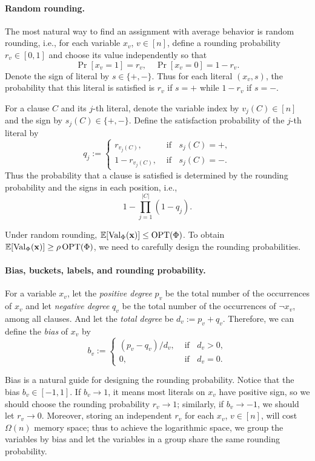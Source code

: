 \paragraph{Random rounding.} The most natural way to find an assignment with average behavior is random rounding, i.e., for each variable $x_v$, $v\in [n]$, define a rounding probability $r_v\in [0,1]$ and choose its value independently so that 
\[
\Pr[x_v=1] = r_v,\quad \Pr[x_v=0] = 1-  r_v.
\]
Denote the sign of  literal by $s\in \{+,-\}$. Thus for each literal $(x_v,s)$, the probability that this literal is satisfied is
$r_v$ if $s= +$ while $1-r_v$ if $s= -$.



For a clause $C$ and its $j$-th literal, denote the variable index by $v_{j}(C)\in [n]$ and the sign by $s_{j}(C)\in \{+,-\}$.
Define the satisfaction probability of the $j$-th literal by \[
q_{j} := \begin{cases}
    r_{v_{j}(C)},& \text{ if }\;\; s_{j}(C)=+,\\
    1-r_{v_{j}(C)},& \text{ if }\;\; s_{j}(C)=-.
\end{cases}
\]
Thus the probability that a clause is satisfied is determined by the rounding probability and the signs in each position, i.e., 
\begin{equation}
\label{eq:satisfied_probability}
    1-\prod_{j=1}^{|C|}(1-q_{j}).
\end{equation} 

Under random rounding, $\mathbb E[\operatorname{Val}_\Phi(\mathbf{x})]\le\operatorname{OPT}(\Phi)$. To obtain $\mathbb E[\operatorname{Val}_\Phi(\mathbf{x})]\ge\rho\operatorname{OPT}(\Phi)$, we need to carefully design the rounding probabilities. 


\paragraph{Bias, buckets, labels, and  rounding probability.}
For a variable $x_v$, let the \textit{positive degree}  $p_v$ be the total  number of the occurrences of $x_v$ and let \textit{negative degree}  $q_v$  be the total number of the occurrences of $\lnot x_v$,  among all clauses. And let the  \textit{total degree}  be $d_v:=p_v+q_v$. Therefore, we can define the \textit{bias} of $x_v$ by  \[
b_{v}:=\begin{cases}
    (p_v-q_v)/d_v, & \text{ if }\;\; d_v>0,\\
    0, & \text{ if }\;\; d_v=0.
\end{cases} 
\]

Bias is a natural guide for designing the rounding probability. Notice that the bias $b_v\in [-1,1]$. If $b_v\to 1$, it means most literals on $x_v$ have positive sign, so we should choose the rounding probability $r_v\to 1$; similarly, if $b_v\to -1$, we should let $r_v\to 0$. Moreover, storing an independent $r_v$ for each $x_v$, $v\in [n]$, will cost $\Omega(n)$ memory space; thus to achieve the logarithmic space, we group the variables by bias and let the variables in a  group share the same rounding probability.


